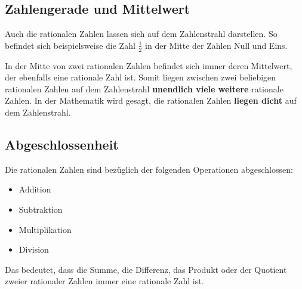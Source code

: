 \subsection{Zahlengerade und Mittelwert}

Auch die rationalen Zahlen lassen sich auf dem Zahlenstrahl darstellen. So befindet sich beispielsweise die Zahl $\frac{1}{2}$ in der Mitte der Zahlen Null und Eins.

\begin{center}
\end{center}
In der Mitte von zwei rationalen Zahlen befindet sich immer deren Mittelwert, der ebenfalls eine rationale Zahl ist. Somit liegen zwischen zwei beliebigen rationalen Zahlen auf dem Zahlenstrahl \textbf{unendlich viele weitere} rationale Zahlen. In der Mathematik wird gesagt, die rationalen Zahlen \textbf{liegen dicht} auf dem Zahlenstrahl.

\subsection{Abgeschlossenheit}

Die rationalen Zahlen sind bezüglich der folgenden Operationen abgeschlossen:
\begin{itemize}[noitemsep]
  \item Addition
  \item Subtraktion
  \item Multiplikation
  \item Division
\end{itemize}
Das bedeutet, dass die Summe, die Differenz, das Produkt oder der Quotient zweier rationaler Zahlen immer eine rationale Zahl ist.

